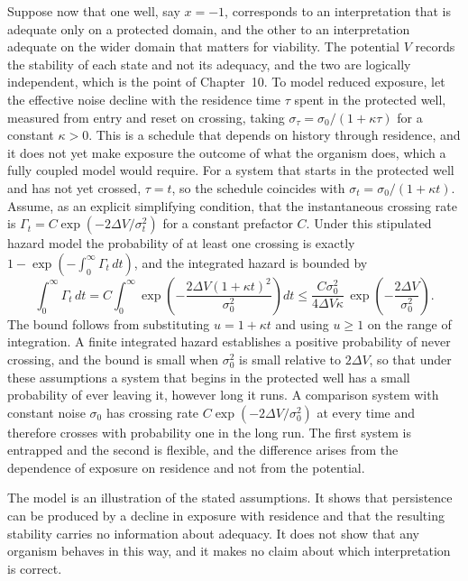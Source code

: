 Suppose now that one well, say $x=-1$, corresponds to an interpretation that is adequate only on a protected domain, and the other to an interpretation adequate on the wider domain that matters for viability. The potential $V$ records the stability of each state and not its adequacy, and the two are logically independent, which is the point of Chapter~10. To model reduced exposure, let the effective noise decline with the residence time $\tau$ spent in the protected well, measured from entry and reset on crossing, taking $\sigma_\tau=\sigma_0/(1+\kappa\tau)$ for a constant $\kappa>0$. This is a schedule that depends on history through residence, and it does not yet make exposure the outcome of what the organism does, which a fully coupled model would require. For a system that starts in the protected well and has not yet crossed, $\tau=t$, so the schedule coincides with $\sigma_t=\sigma_0/(1+\kappa t)$. Assume, as an explicit simplifying condition, that the instantaneous crossing rate is $\Gamma_t=C\exp(-2\Delta V/\sigma_t^2)$ for a constant prefactor $C$. Under this stipulated hazard model the probability of at least one crossing is exactly $1-\exp\!\left(-\int_0^\infty\Gamma_t\,dt\right)$, and the integrated hazard is bounded by
\[
\int_0^\infty \Gamma_t\,dt=C\int_0^\infty\exp\!\left(-\frac{2\Delta V(1+\kappa t)^2}{\sigma_0^2}\right)dt\le \frac{C\sigma_0^2}{4\Delta V\kappa}\,\exp\!\left(-\frac{2\Delta V}{\sigma_0^2}\right).
\]
The bound follows from substituting $u=1+\kappa t$ and using $u\ge1$ on the range of integration. A finite integrated hazard establishes a positive probability of never crossing, and the bound is small when $\sigma_0^2$ is small relative to $2\Delta V$, so that under these assumptions a system that begins in the protected well has a small probability of ever leaving it, however long it runs. A comparison system with constant noise $\sigma_0$ has crossing rate $C\exp(-2\Delta V/\sigma_0^2)$ at every time and therefore crosses with probability one in the long run. The first system is entrapped and the second is flexible, and the difference arises from the dependence of exposure on residence and not from the potential.

The model is an illustration of the stated assumptions. It shows that persistence can be produced by a decline in exposure with residence and that the resulting stability carries no information about adequacy. It does not show that any organism behaves in this way, and it makes no claim about which interpretation is correct.
